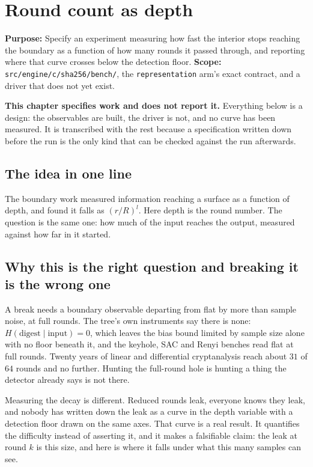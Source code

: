 \chapter{Round count as depth}

\textbf{Purpose:} Specify an experiment measuring how fast the interior stops reaching the boundary as a function of how many rounds it passed through, and reporting where that curve crosses below the detection floor. \textbf{Scope:} \texttt{src/\allowbreak{}engine/\allowbreak{}c/\allowbreak{}sha256/\allowbreak{}bench/}, the \texttt{representation} arm's exact contract, and a driver that does not yet exist.

\textbf{This chapter specifies work and does not report it.} Everything below is a design: the observables are built, the driver is not, and no curve has been measured. It is transcribed with the rest because a specification written down before the run is the only kind that can be checked against the run afterwards.

\section{The idea in one line}

The boundary work measured information reaching a surface as a function of depth, and found it falls as \((r/R)^l\). Here depth is the round number. The question is the same one: how much of the input reaches the output, measured against how far in it started.

\section{Why this is the right question and breaking it is the wrong one}

A break needs a boundary observable departing from flat by more than sample noise, at full rounds. The tree's own instruments say there is none: \(H(\text{digest} \mid \text{input}) = 0\), which leaves the bias bound limited by sample size alone with no floor beneath it, and the keyhole, SAC and Renyi benches read flat at full rounds. Twenty years of linear and differential cryptanalysis reach about \(31\) of \(64\) rounds and no further. Hunting the full-round hole is hunting a thing the detector already says is not there.

Measuring the decay is different. Reduced rounds leak, everyone knows they leak, and nobody has written down the leak as a curve in the depth variable with a detection floor drawn on the same axes. That curve is a real result. It quantifies the difficulty instead of asserting it, and it makes a falsifiable claim: the leak at round \(k\) is this size, and here is where it falls under what this many samples can see.


